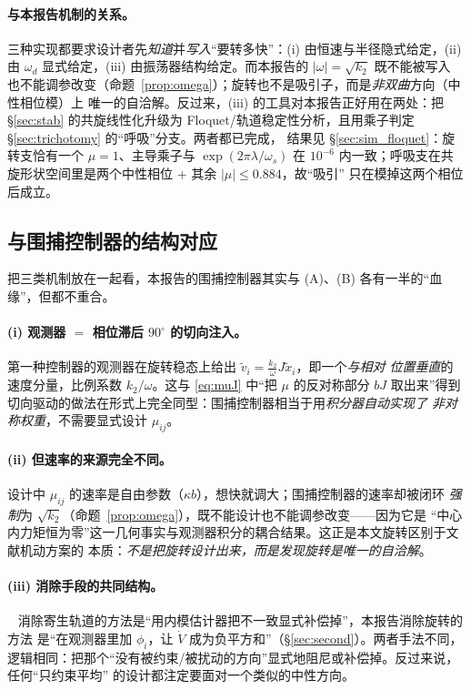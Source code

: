 \documentclass[11pt,a4paper]{ctexart}
\theoremstyle{plain}
\theoremstyle{definition}
\theoremstyle{remark}
\newcommand{\txi}{\tilde{x}}
\newcommand{\tv}{\tilde{v}}
\newcommand{\abs}[1]{\left|#1\right|}
\begin{document}
\paragraph{与本报告机制的关系。}
三种实现都要求设计者先\emph{知道}并\emph{写入}“要转多快”：(i) 由恒速与半径隐式给定，(ii) 由
$\omega_d$ 显式给定，(iii) 由振荡器结构给定。而本报告的 $\abs{\omega}=\sqrt{k_2}$ 既不能被写入
也不能调参改变（命题~\ref{prop:omega}）；旋转也不是吸引子，而是\emph{非双曲}方向（中性相位模）上
唯一的自洽解。反过来，(iii) 的工具对本报告正好用在两处：把\S\ref{sec:stab} 的共旋线性化升级为
Floquet/轨道稳定性分析，且用乘子判定\S\ref{sec:trichotomy} 的“呼吸”分支。两者都已完成，
结果见 \S\ref{sec:sim_floquet}：旋转支恰有一个 $\mu=1$、主导乘子与 $\exp(2\pi\lambda/\omega_s)$
在 $10^{-6}$ 内一致；呼吸支在共旋形状空间里是两个中性相位 + 其余 $|\mu|\le0.884$，故“吸引”
只在模掉这两个相位后成立。

\subsection{与围捕控制器的结构对应}
\label{sec:meth_relation}

把三类机制放在一起看，本报告的围捕控制器其实与 (A)、(B) 各有一半的“血缘”，但都不重合。

\paragraph{(i) 观测器 $=$ 相位滞后 $90^\circ$ 的切向注入。}
第一种控制器的观测器在旋转稳态上给出 $\tv_i=\frac{k_2}{\omega}J\txi_i$，即一个\emph{与相对
位置垂直}的速度分量，比例系数 $k_2/\omega$。这与 \eqref{eq:muJ} 中“把 $\mu$ 的反对称部分
$bJ$ 取出来”得到切向驱动的做法在形式上完全同型：围捕控制器相当于用\emph{积分器自动实现了
非对称权重}，不需要显式设计 $\mu_{ij}$。

\paragraph{(ii) 但速率的来源完全不同。}
设计中 $\mu_{ij}$ 的速率是自由参数（$\kappa b$），想快就调大；围捕控制器的速率却被闭环
\emph{强制}为 $\sqrt{k_2}$（命题~\ref{prop:omega}），既不能设计也不能调参改变——因为它是
“中心内力矩恒为零”这一几何事实与观测器积分的耦合结果。这正是本文旋转区别于文献机动方案的
本质：\emph{不是把旋转设计出来，而是发现旋转是唯一的自洽解}。

\paragraph{(iii) 消除手段的共同结构。}
~\cite{tro2015} 消除寄生轨道的方法是“用内模估计器把不一致显式补偿掉”，本报告消除旋转的方法
是“在观测器里加 $\phi_i$，让 $\dot V$ 成为负平方和”（\S\ref{sec:second}）。两者手法不同，
逻辑相同：把那个“没有被约束/被扰动的方向”显式地阻尼或补偿掉。反过来说，任何“只约束平均”
的设计都注定要面对一个类似的中性方向。
\end{document}
